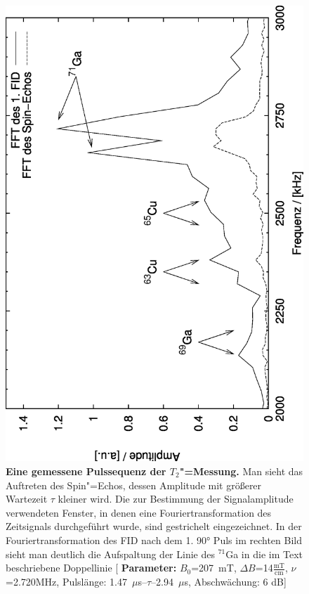 \begin{figure}[htp]
\begin{center}
		\includegraphics[angle=-90,width=\bigwidth]{plots/t2_auswert_shots_2}
	\end{center}
	\caption[Eine gemessene Pulssequenz der $T_2$"=Messung]{{\upshape\bfseries Eine gemessene Pulssequenz der $T_2$"=Messung.} Man sieht das
		Auftreten des Spin"=Echos, dessen Amplitude mit größerer Wartezeit $\tau$ kleiner wird. Die
		zur Bestimmung der Signalamplitude verwendeten Fenster, in denen eine Fouriertransformation
		des Zeitsignals durchgeführt wurde, sind gestrichelt eingezeichnet. In der
		Fouriertransformation des FID nach dem 1. 90° Puls im rechten Bild sieht man deutlich die
		Aufspaltung der Linie des $^{71}$Ga in die im Text beschriebene Doppellinie [{\bfseries
		Parameter:} $B_0$=207~mT, $\Delta B$=14$\frac{\mathrm{mT}}{\mathrm{cm}}$, $\nu$=2.720MHz,
		Pulslänge: 1.47~$\mu$s--$\tau$--2.94~$\mu$s, Abschwächung: 6 dB]}
	\label{fig:t2messung}
 \end{figure}


